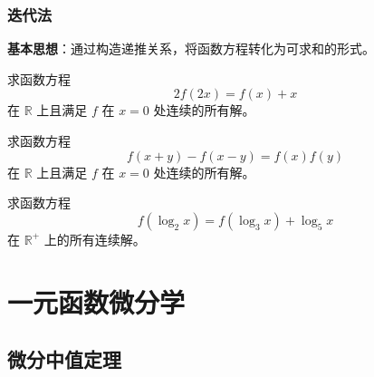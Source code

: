 \documentclass[lang=cn,10pt,thmcnt=section]{elegantbook}
\begin{document}
\subsection{迭代法}
\textbf{基本思想}：通过构造递推关系，将函数方程转化为可求和的形式。
\begin{example}
	求函数方程 
\[ 2f(2x) = f(x) + x \]
在 $\mathbb{R}$ 上且满足 $f$ 在 $x=0$ 处连续的所有解。
\end{example}
\begin{example}
	求函数方程
\[ f(x+y) - f(x-y) = f(x)f(y) \]
在 $\mathbb{R}$ 上且满足 $f$ 在 $x=0$ 处连续的所有解。
\end{example}
\begin{example}
	求函数方程 
    \[ f(\log_2 x) = f(\log_3 x) + \log_5 x \]
    在 \( \mathbb{R}^+ \) 上的所有连续解。
\end{example}

\chapter{一元函数微分学}
\section{微分中值定理}
\end{document}
